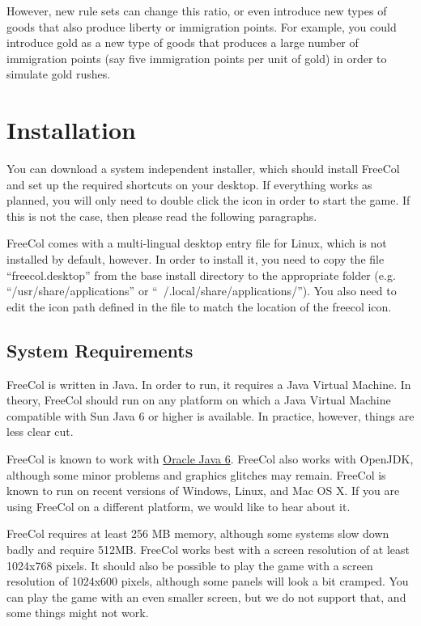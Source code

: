\documentclass[12pt]{book}
\begin{document}
However, new rule sets can change this ratio, or even introduce new
types of goods that also produce liberty or immigration points. For
example, you could introduce gold as a new type of goods that produces
a large number of immigration points (say five immigration points per
unit of gold) in order to simulate gold rushes.



\hypertarget{Installation}{\chapter{Installation}}

You can download a system independent installer, which should install
FreeCol and set up the required shortcuts on your desktop. If
everything works as planned, you will only need to double click the
icon in order to start the game. If this is not the case, then please
read the following paragraphs.

FreeCol comes with a multi-lingual desktop entry file for Linux, which
is not installed by default, however. In order to install it, you need
to copy the file ``freecol.desktop'' from the base install directory
to the appropriate folder (e.g. ``/usr/share/applications'' or
``~/.local/share/applications/''). You also need to edit the icon path
defined in the file to match the location of the freecol icon.


\hypertarget{System Requirements}{\section{System Requirements}}

FreeCol is written in Java. In order to run, it requires a Java
Virtual Machine. In theory, FreeCol should run on any platform on
which a Java Virtual Machine compatible with Sun Java 6 or higher is
available. In practice, however, things are less clear cut.

FreeCol is known to work with \href{http://java.sun.com/}{Oracle Java
  6}. FreeCol also works with OpenJDK, although some minor problems
and graphics glitches may remain. FreeCol is known to run on recent
versions of Windows, Linux, and Mac OS X. If you are using FreeCol on
a different platform, we would like to hear about it.

FreeCol requires at least 256 MB memory, although some systems slow
down badly and require 512MB.  FreeCol works best with a screen
resolution of at least 1024x768 pixels. It should also be possible to
play the game with a screen resolution of 1024x600 pixels, although
some panels will look a bit cramped. You can play the game with an
even smaller screen, but we do not support that, and some things might
not work.
\end{document}
